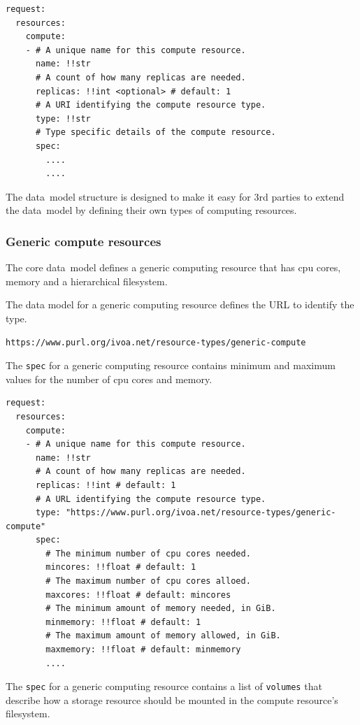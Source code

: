 \documentclass[11pt,a4paper]{ivoa}
\newcommand{\datamodel} {data~model}
\newcommand{\codeword}[1] {\texttt{#1}}
\begin{document}
\begin{lstlisting}[]
request:
  resources:
    compute:
    - # A unique name for this compute resource.
      name: !!str
      # A count of how many replicas are needed.
      replicas: !!int <optional> # default: 1
      # A URI identifying the compute resource type.
      type: !!str
      # Type specific details of the compute resource.
      spec:
        ....
        ....
\end{lstlisting}

The \datamodel{} structure is designed to make it easy for 3rd parties
to extend the \datamodel{} by defining their own types of computing
resources.

\subsubsection{Generic compute resources}
\label{datamodel-generic-compute}

The core \datamodel{} defines a generic computing resource
that has cpu cores, memory and a hierarchical filesystem.

The data model for a generic computing resource defines the URL to identify
the type.
\begin{lstlisting}[]
https://www.purl.org/ivoa.net/resource-types/generic-compute
\end{lstlisting}

The \codeword{spec} for a generic computing resource contains
minimum and maximum values for the number of cpu cores and memory.

\begin{lstlisting}[]
request:
  resources:
    compute:
    - # A unique name for this compute resource.
      name: !!str
      # A count of how many replicas are needed.
      replicas: !!int # default: 1
      # A URL identifying the compute resource type.
      type: "https://www.purl.org/ivoa.net/resource-types/generic-compute"
      spec:
        # The minimum number of cpu cores needed.
        mincores: !!float # default: 1
        # The maximum number of cpu cores alloed.
        maxcores: !!float # default: mincores
        # The minimum amount of memory needed, in GiB.
        minmemory: !!float # default: 1
        # The maximum amount of memory allowed, in GiB.
        maxmemory: !!float # default: minmemory
        ....
\end{lstlisting}

The \codeword{spec} for a generic computing resource contains
a list of \codeword{volumes} that describe how a storage resource
should be mounted in the compute resource's filesystem.
\end{document}
